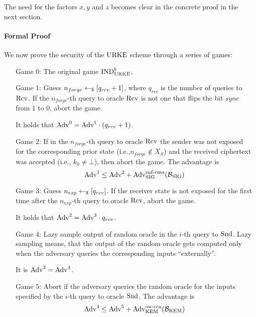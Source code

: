 The need for the factors $x, y$ and $z$ becomes clear in the concrete proof in the next section.

\paragraph{Formal Proof}
We now prove the security of the $\mathrm{URKE}$ scheme through a series of games:

\begin{itemize}[leftmargin=2.0cm]
    \item[Game 0:] The original game ${\mathrm{IND}}_{\mathrm{URKE}}^b$.
    \item[Game 1:] Guess $n_{forge}\gets_\$ [q_{rcv}+1]$, where $q_{rcv}$ is the number of queries to $\mathrm{Rcv}$.
        If the $n_{forge}$-th query to oracle $\mathrm{Rcv}$ is not one that flips the bit $\mathit{sync}$ from $1$ to $0$, abort the game.

        It holds that $\mathrm{Adv}^0=\mathrm{Adv}^1\cdot(q_{rcv}+1)$.
    \item[Game 2:] If in the $n_{forge}$-th query to oracle $\mathrm{Rcv}$ the sender was not exposed for the corresponding prior state (i.e.,$n_{forge}\notin X_S$) and the received ciphertext was accepted (i.e., $k_0\neq\bot$), then abort the game.
        The advantage is
        \[\mathrm{Adv}^1\leq\mathrm{Adv}^2 + \mathrm{Adv}_{\mathrm{SIG}}^{\mathrm{suf}\text{-}\mathrm{cma}}(\mathcal{B}_{\mathrm{SIG}})\]
    \item[Game 3:] Guess $n_{exp}\gets_\$ [q_{rcv}]$.
        If the receiver state is not exposed for the first time after the $n_{exp}$-th query to oracle $\mathrm{Rcv}$, abort the game.

        It holds that $\mathrm{Adv}^2=\mathrm{Adv}^3\cdot q_{rcv}$.
        
    \item[Game 4:] Lazy sample output of random oracle in the $i$-th query to $\mathrm{Snd}$.
        Lazy sampling means, that the output of the random oracle gets computed only when the adversary queries the corresponding inputs ``externally''. 

        It is $\mathrm{Adv}^3=\mathrm{Adv}^4$.
    \item[Game 5:] Abort if the adversary queries the random oracle for the inputs specified by the $i$-th query to oracle $\mathrm{Snd}$.
        The advantage is
        \[\mathrm{Adv}^4\leq\mathrm{Adv}^5 + \mathrm{Adv}_{\mathrm{KEM}}^{\mathrm{ow}\text{-}\mathrm{cca}}(\mathcal{B}_{\mathrm{KEM}})\]
\end{itemize}

